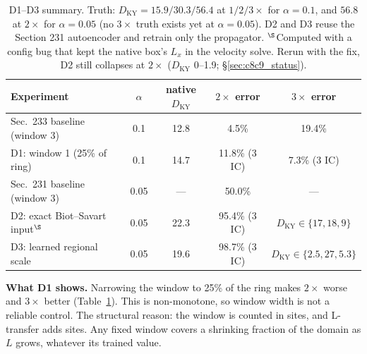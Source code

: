 \documentclass[11pt]{article}
\begin{document}
\begin{table}[h]
\centering
\small
\begin{tabular}{lcccc}
\toprule
Experiment & $\alpha$ & native $D_{\mathrm{KY}}$ & $2\times$ error & $3\times$ error \\
\midrule
Sec.\ 233 baseline (window 3) & 0.1 & 12.8 & 4.5\% & 19.4\% \\
D1: window 1 (25\% of ring) & 0.1 & 14.7 & 11.8\% (3 IC) & 7.3\% (3 IC) \\
\midrule
Sec.\ 231 baseline (window 3) & 0.05 & --- & 50.0\% & --- \\
D2: exact Biot--Savart input$^\S$ & 0.05 & 22.3 & 95.4\% (3 IC) & $D_{\mathrm{KY}}\in\{17,18,9\}$ \\
D3: learned regional scale & 0.05 & 19.6 & 98.7\% (3 IC) & $D_{\mathrm{KY}}\in\{2.5,27,5.3\}$ \\
\bottomrule
\end{tabular}
\caption{D1--D3 summary. Truth: $D_{\mathrm{KY}}=15.9/30.3/56.4$ at
$1/2/3\times$ for $\alpha{=}0.1$, and $56.8$ at $2\times$ for
$\alpha{=}0.05$ (no $3\times$ truth exists yet at $\alpha{=}0.05$). D2 and
D3 reuse the Section 231 autoencoder and retrain only the propagator.
$^\S$Computed with a config bug that kept the native box's $L_x$ in the velocity solve. Rerun with the fix, D2 still collapses at $2\times$ ($D_{\mathrm{KY}}$ 0--1.9; \S\ref{sec:c8c9_status}).}
\label{tab:d1d3}
\end{table}

\textbf{What D1 shows.} Narrowing the window to 25\% of the ring makes
$2\times$ worse and $3\times$ better (Table~\ref{tab:d1d3}). This is
non-monotone, so window width is not a reliable control. The structural
reason: the window is counted in sites, and L-transfer adds sites. Any
fixed window covers a shrinking fraction of the domain as $L$ grows,
whatever its trained value.
\end{document}
